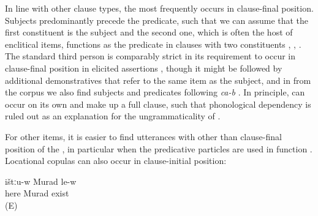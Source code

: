 In line with other clause types, the  most frequently occurs in clause-final position. Subjects predominantly precede the predicate, such that we can assume that the first  constituent is the  subject and the second one, which is often the host of enclitical  items, functions as the predicate in clauses with two  constituents , , . The standard third person   is comparably strict in its requirement to occur in clause-final position in elicited assertions , though it might be followed by additional demonstratives that refer to the same item as the subject, and in  from the corpus we also find  subjects and predicates following \textit{ca-b} . In principle,  can occur on its own and make up a full clause, such that phonological dependency is ruled out as an explanation for the ungrammaticality of . 


\begin{exe}
	\ex	\label{ex:Murad is a / the master}
	\begin{xlist}
	
		 \label{ex:Murad is a / the master@B}
		 \label{ex:Murad is a / the master@C}
	\end{xlist}
\end{exe}

For other  items, it is easier to find utterances with other than clause-final position of the , in particular when the predicative particles are used in  function . Locational copulas can also occur in clause-initial position:

\begin{exe}
	\ex	\label{ex:Murad is here}
	\begin{xlist}
		\ex	\label{ex:Murad is here@A}
		\gll	ištːu-w	Murad	le-w\\
			here	Murad	exist\tsc{-m}\\
		\glt	\sqt{Murad is here.} (E)
	
		\ex	{}	\label{ex:Murad is here@B}
	\end{xlist}
\end{exe}

